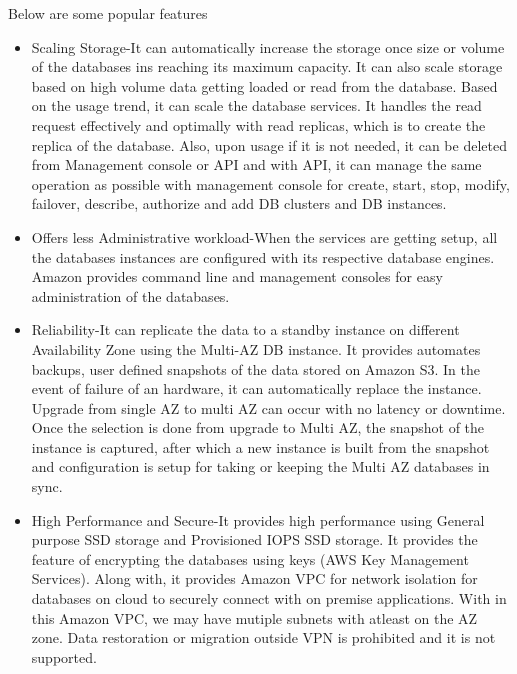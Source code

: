 Below are some popular features 
\begin{itemize}
	
\item Scaling Storage-It can automatically increase the storage once 
size or volume of the databases ins reaching its maximum capacity. It 
can also 
scale storage based on high volume data getting loaded or read 
from the database. Based on the usage trend, it can scale the database 
services. It handles the read request effectively and optimally with read 
replicas, which is to create the replica of the database. 
Also, upon usage if it is not needed, it can be deleted from Management 
console or API and with API, it can manage the same operation as possible 
with management console for create, start, stop, modify, failover, 
describe, authorize and add DB clusters and DB instances.

\item Offers less Administrative workload-When the services are getting 
setup, all the databases instances are configured with its respective 
database engines. Amazon provides command line and management consoles for 
easy administration of the databases.

\item Reliability-It can replicate the data to a standby instance on 
different Availability Zone using the Multi-AZ DB instance. It provides  
automates backups, user defined snapshots of the data stored 
on Amazon S3. 
In the event of failure of an hardware, it can automatically replace the 
instance. Upgrade from single AZ to multi AZ can occur with no latency or 
downtime. Once the selection is done from upgrade to Multi AZ, the snapshot 
of the instance is captured, after which a new instance is built from the 
snapshot and configuration is setup for taking or keeping the 
Multi AZ databases in sync.
~\cite{hid-sp18-520-amazonrdsfaqs}

\item High Performance and Secure-It provides high performance using General 
purpose SSD storage and Provisioned IOPS SSD storage. It provides the feature 
of encrypting the databases using keys (AWS Key Management Services). 
Along with, it provides Amazon VPC for network isolation for databases on 
cloud to securely connect with on premise applications. 
With in this Amazon VPC, we may have mutiple subnets with atleast on 
the AZ zone. Data restoration or migration outside VPN is prohibited and 
it is not supported. 

\end{itemize}

